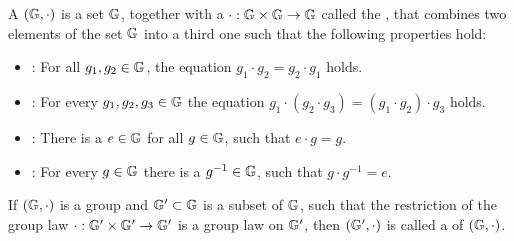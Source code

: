 \begin{definition}
\label{def:commutative_group}
A  $(\mathbb{G},\cdot) $ is a set $\mathbb{G}$, together with a  $\cdot:\mathbb{G} \times \mathbb{G} \to \mathbb{G} $ called the , that combines two elements of the set $ \mathbb{G}$ into a third one such that the following properties hold:
\begin{itemize}
\item {}: For all $g_1,g_2\in\mathbb{G}$, the equation $g_1\cdot g_2=g_2\cdot g_1$ holds.
\item {}: For every $g_1,g_2,g_3\in\mathbb{G}$ the equation
$g_1\cdot(g_2\cdot g_3) = (g_1\cdot g_2)\cdot g_3$ holds.
\item {}: There is a $e\in\mathbb{G}$ for all $g\in\mathbb{G}$, such that $e\cdot g=g$.
\item {}: For every $g\in\mathbb{G}$ there is a $g^{-1}\in\mathbb{G}$, such that $g\cdot g^{-1}=e$.
\end{itemize}
If $(\mathbb{G},\cdot)$ is a group and $\mathbb{G}'\subset\mathbb{G}$ is a subset of $\mathbb{G}$, such that the restriction of the group law $\cdot: \mathbb{G}'\times \mathbb{G}' \to \mathbb{G}'$ is a group law on $\mathbb{G}'$, then $(\mathbb{G}',\cdot)$ is called a  of $(\mathbb{G},\cdot)$.
\end{definition}

